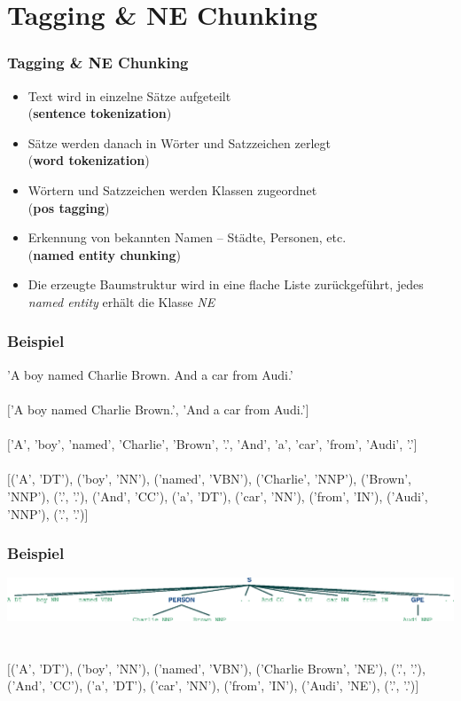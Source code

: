 \section{Tagging \& NE Chunking}

\begin{frame}
  \frametitle{Tagging \& NE Chunking}

  \begin{itemize}
  \item Text wird in einzelne Sätze aufgeteilt\\(\textbf{sentence tokenization})
  \item Sätze werden danach in Wörter und Satzzeichen zerlegt\\(\textbf{word tokenization})
  \item Wörtern und Satzzeichen werden Klassen zugeordnet\\(\textbf{pos
    tagging})
  \item Erkennung von bekannten Namen -- Städte, Personen, etc.\\(\textbf{named
    entity chunking})
  \item Die erzeugte Baumstruktur wird in eine flache Liste
    zurückgeführt, jedes \textit{named entity} erhält die Klasse \textit{NE}
  \end{itemize}
\end{frame}

\begin{frame}
  \frametitle{Beispiel}
  
  'A boy named Charlie Brown. And a car from Audi.'
  ~\\~\\
  \ensuremath {[}'A boy named Charlie Brown.', 'And a car from
  Audi.'\ensuremath{]}
  ~\\~\\
  \ensuremath{[}'A', 'boy', 'named', 'Charlie', 'Brown', '.', 'And', 'a', 'car',
  'from', 'Audi', '.'\ensuremath{]}
  ~\\~\\
  \ensuremath{[}('A', 'DT'), ('boy', 'NN'), ('named', 'VBN'), ('Charlie', 'NNP'),
  ('Brown', 'NNP'), ('.', '.'), ('And', 'CC'), ('a', 'DT'), ('car',
  'NN'), ('from', 'IN'), ('Audi', 'NNP'), ('.', '.')\ensuremath{]}
\end{frame}

\begin{frame}
  \frametitle{Beispiel}

  \includegraphics[scale=0.45]{img/ne_chunk_tree}
  ~\\~\\
  \ensuremath{[}('A', 'DT'), ('boy', 'NN'), ('named', 'VBN'),
  ('Charlie Brown', 'NE'), ('.', '.'), ('And', 'CC'), ('a', 'DT'),
  ('car', 'NN'), ('from', 'IN'), ('Audi', 'NE'), ('.', '.')\ensuremath{]}
\end{frame}

